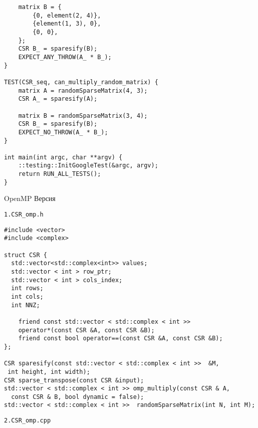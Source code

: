 \documentclass{report}
\begin{document}
\begin{lstlisting}
    matrix B = {
        {0, element(2, 4)},
        {element(1, 3), 0},
        {0, 0},
    };
    CSR B_ = sparesify(B);
    EXPECT_ANY_THROW(A_ * B_);
}

TEST(CSR_seq, can_multiply_random_matrix) {
    matrix A = randomSparseMatrix(4, 3);
    CSR A_ = sparesify(A);

    matrix B = randomSparseMatrix(3, 4);
    CSR B_ = sparesify(B);
    EXPECT_NO_THROW(A_ * B_);
}

int main(int argc, char **argv) {
    ::testing::InitGoogleTest(&argc, argv);
    return RUN_ALL_TESTS();
}
\end{lstlisting}

\par OpenMP Версия
\par \verb|1.CSR_omp.h|
\begin{lstlisting}
#include <vector>
#include <complex>

struct CSR {
  std::vector<std::complex<int>> values;
  std::vector < int > row_ptr;
  std::vector < int > cols_index;
  int rows;
  int cols;
  int NNZ;

    friend const std::vector < std::complex < int >>
    operator*(const CSR &A, const CSR &B);
    friend const bool operator==(const CSR &A, const CSR &B);
};

CSR sparesify(const std::vector < std::complex < int >>  &M,
 int height, int width);
CSR sparse_transpose(const CSR &input);
std::vector < std::complex < int >> omp_multiply(const CSR & A,
  const CSR & B, bool dynamic = false);
std::vector < std::complex < int >>  randomSparseMatrix(int N, int M);
\end{lstlisting}
\par \verb|2.CSR_omp.cpp|
\end{document}

